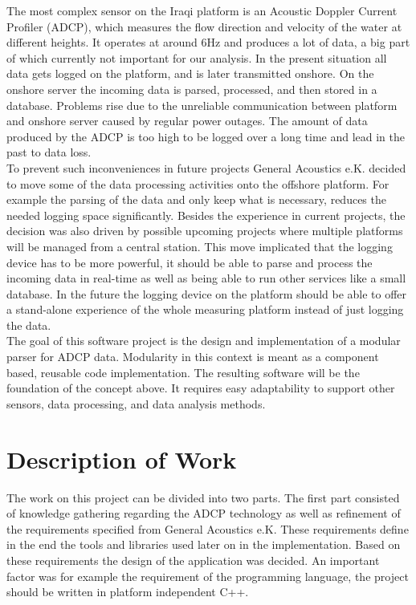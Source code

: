 The most complex sensor on the Iraqi platform is an Acoustic Doppler Current Profiler (ADCP), which measures the flow direction and velocity of the water at different heights. It operates at around 6Hz and produces a lot of data, a big part of which currently not important for our analysis. In the present situation all data gets logged on the platform, and is later transmitted onshore. On the onshore server the incoming data is parsed, processed, and then stored in a database. Problems rise due to the unreliable communication between platform and onshore server caused by regular power outages. The amount of data produced by the ADCP is too high to be logged over a long time and lead in the past to data loss.\\\newline
To prevent such inconveniences in future projects General Acoustics e.K. decided to move some of the data processing activities onto the offshore platform. For example the parsing of the data and only keep what is necessary, reduces the needed logging space significantly. Besides the experience in current projects, the decision was also driven by possible upcoming projects where multiple platforms will be managed from a central station. This move implicated that the logging device has to be more powerful, it should be able to parse and process the incoming data in real-time as well as being able to run other services like a small database. In the future the logging device on the platform should be able to offer a stand-alone experience of the whole measuring platform instead of just logging the data.\\\newline
The goal of this software project is the design and implementation of a modular parser for ADCP data. Modularity in this context is meant as a component based, reusable code implementation. The resulting software will be the foundation of the concept above. It requires easy adaptability to support other sensors, data processing, and data analysis methods. 

\section{Description of Work}
The work on this project can be divided into two parts. The first part consisted of knowledge gathering regarding the ADCP technology as well as refinement of the requirements specified from General Acoustics e.K. These requirements define in the end the tools and libraries used later on in the implementation. Based on these requirements the design of the application was decided. An important factor was for example the requirement of the programming language, the project should be written in platform independent C++.

